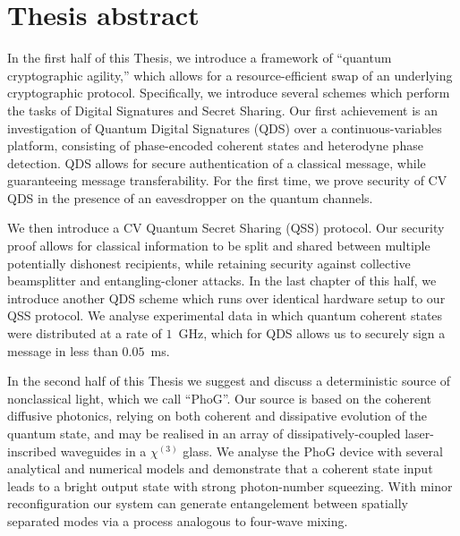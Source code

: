 \chapter*{\hfill Thesis abstract}

In the first half of this Thesis, we introduce a framework of ``quantum cryptographic agility,'' which allows for a resource-efficient swap of an underlying cryptographic protocol. Specifically, we introduce several schemes which perform the tasks of Digital Signatures and Secret Sharing. Our first achievement is an investigation of Quantum Digital Signatures (QDS) over a continuous-variables platform, consisting of phase-encoded coherent states and heterodyne phase detection. QDS allows for secure authentication of a classical message, while guaranteeing message transferability. For the first time, we prove security of CV QDS in the presence of an eavesdropper on the quantum channels. 

We then introduce a CV Quantum Secret Sharing (QSS) protocol. Our security proof allows for classical information to be split and shared between multiple potentially dishonest recipients, while retaining security against collective beamsplitter and entangling-cloner attacks. In the last chapter of this half, we introduce another QDS scheme which runs over identical hardware setup to our QSS protocol. We analyse experimental data in which quantum coherent states were distributed at a rate of $1$~GHz, which for QDS allows us to securely sign a message in less than $0.05$~ms.

In the second half of this Thesis we suggest and discuss a deterministic source of nonclassical light, which we call ``PhoG''. Our source is based on the coherent diffusive photonics, relying on both coherent and dissipative evolution of the quantum state, and may be realised in an array of dissipatively-coupled laser-inscribed waveguides in a $\chi^{\left(3\right)}$ glass. We analyse the PhoG device with several analytical and numerical models and demonstrate that a coherent state input leads to a bright output state with strong photon-number squeezing. With minor reconfiguration our system can generate entangelement between spatially separated modes via a process analogous to four-wave mixing.
